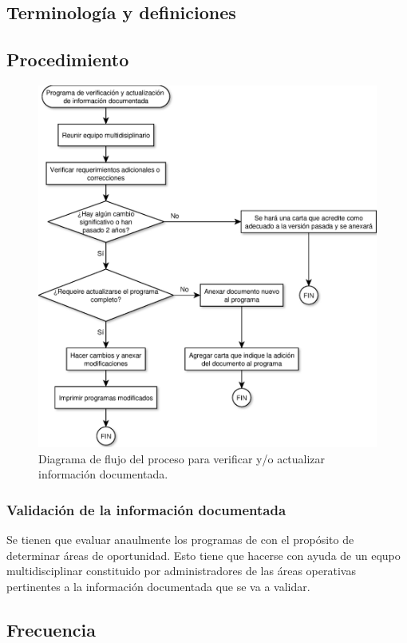 \subsection{Terminología y definiciones}
\begin{description}
\end{description}

\subsection{Procedimiento}

\begin{figure}[h]
    \centering
    \includegraphics[width=0.5\linewidth]{src/diagramas/G1_AV1.eps}
    \caption{Diagrama de flujo del proceso para verificar y/o actualizar información documentada.}
\end{figure}

\subsubsection{Validación de la información documentada}
Se tienen que evaluar anaulmente los programas de  con el propósito de determinar áreas de oportunidad. Esto tiene que hacerse con ayuda de un equpo multidisciplinar constituido por administradores de las áreas operativas pertinentes a la información documentada que se va a validar.
\newpage

\subsection{Frecuencia}



